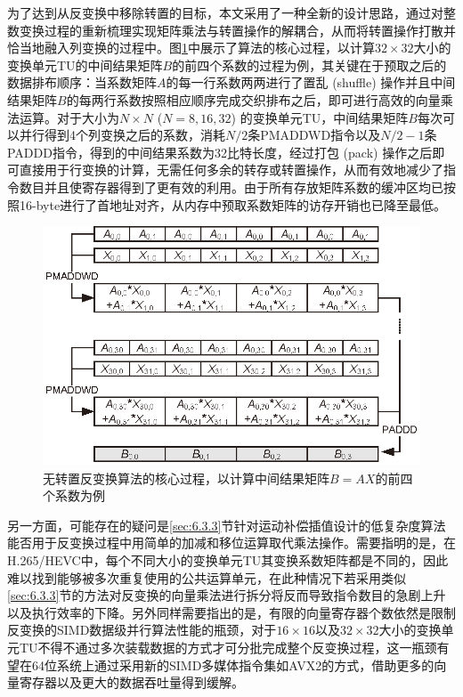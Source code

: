 为了达到从反变换中移除转置的目标，本文采用了一种全新的设计思路，通过对整数变换过程的重新梳理实现矩阵乘法与转置操作的解耦合，从而将转置操作打散并恰当地融入列变换的过程中。图\ref{fig:transpose-free_IT}中展示了算法的核心过程，以计算$32 \times 32$大小的变换单元TU的中间结果矩阵$B$的前四个系数的过程为例，其关键在于预取之后的数据排布顺序：当系数矩阵$A$的每一行系数两两进行了置乱 (shuffle) 操作并且中间结果矩阵$B$的每两行系数按照相应顺序完成交织排布之后，即可进行高效的向量乘法运算。对于大小为$N \times N$ ($N = 8, 16, 32$) 的变换单元TU，中间结果矩阵$B$每次可以并行得到4个列变换之后的系数，消耗$N/2$条PMADDWD指令以及$N/2 - 1$条PADDD指令，得到的中间结果系数为32比特长度，经过打包 (pack) 操作之后即可直接用于行变换的计算，无需任何多余的转存或转置操作，从而有效地减少了指令数目并且使寄存器得到了更有效的利用。由于所有存放矩阵系数的缓冲区均已按照16-byte进行了首地址对齐，从内存中预取系数矩阵的访存开销也已降至最低。

\begin{figure}[!tp]
	\centering
	\includegraphics[width = 0.8\linewidth]{eps/transpose-free_IT}
	\caption{\label{fig:transpose-free_IT}
		无转置反变换算法的核心过程，以计算中间结果矩阵$B=AX$的前四个系数为例}
\end{figure}

另一方面，可能存在的疑问是\ref{sec:6.3.3}节针对运动补偿插值设计的低复杂度算法能否用于反变换过程中用简单的加减和移位运算取代乘法操作。需要指明的是，在H.265/HEVC中，每个不同大小的变换单元TU其变换系数矩阵都是不同的，因此难以找到能够被多次重复使用的公共运算单元，在此种情况下若采用类似\ref{sec:6.3.3}节的方法对反变换的向量乘法进行拆分将反而导致指令数目的急剧上升以及执行效率的下降。另外同样需要指出的是，有限的向量寄存器个数依然是限制反变换的SIMD数据级并行算法性能的瓶颈，对于$16 \times 16$以及$32 \times 32$大小的变换单元TU不得不通过多次装载数据的方式才可分批完成整个反变换过程，这一瓶颈有望在64位系统上通过采用新的SIMD多媒体指令集如AVX2的方式，借助更多的向量寄存器以及更大的数据吞吐量得到缓解。

